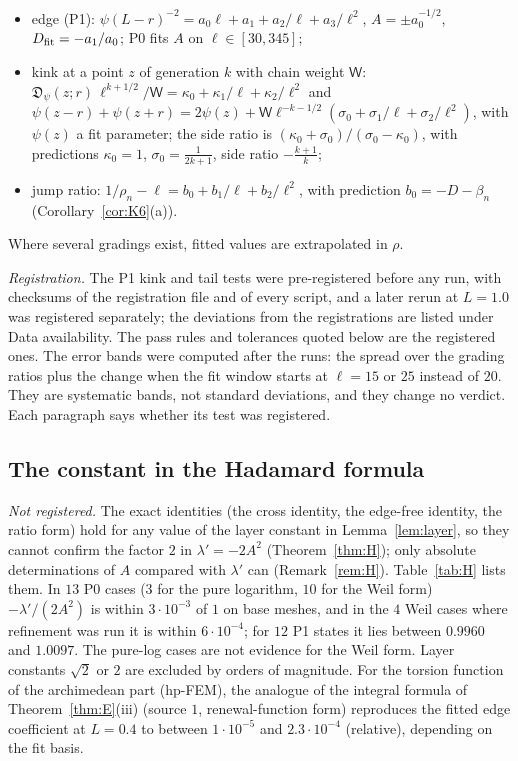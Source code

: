 \documentclass[11pt]{amsart}
\newcommand{\Dj}{\mathfrak{D}}
\newcommand{\e}[1]{\cdot 10^{#1}}
\theoremstyle{definition}
\theoremstyle{remark}
\numberwithin{equation}{section}
\begin{document}
\begin{itemize}
\item edge (P1): $\psi(L-r)^{-2}=a_0\ell+a_1+a_2/\ell+a_3/\ell^2$, $A=\pm a_0^{-1/2}$, $D_{\rm fit}=-a_1/a_0$; P0 fits $A$ on $\ell\in[30,345]$;
\item kink at a point $z$ of generation $k$ with chain weight $\mathsf W$: $\Dj_\psi(z;r)\,\ell^{k+1/2}/\mathsf W=\kappa_0+\kappa_1/\ell+\kappa_2/\ell^2$ and $\psi(z-r)+\psi(z+r)=2\psi(z)+\mathsf W\ell^{-k-1/2}(\sigma_0+\sigma_1/\ell+\sigma_2/\ell^2)$, with $\psi(z)$ a fit parameter; the side ratio is $(\kappa_0+\sigma_0)/(\sigma_0-\kappa_0)$, with predictions $\kappa_0=1$, $\sigma_0=\frac1{2k+1}$, side ratio $-\frac{k+1}k$;
\item jump ratio: $1/\rho_n-\ell=b_0+b_1/\ell+b_2/\ell^2$, with prediction $b_0=-D-\beta_n$ (Corollary~\ref{cor:K6}(a)).
\end{itemize}
Where several gradings exist, fitted values are extrapolated in $\rho$.

\emph{Registration.} The P1 kink and tail tests were pre-registered before any run, with checksums of the registration file and of every script, and a later rerun at $L=1.0$ was registered separately; the deviations from the registrations are listed under Data availability. The pass rules and tolerances quoted below are the registered ones. The error bands were computed after the runs: the spread over the grading ratios plus the change when the fit window starts at $\ell=15$ or $25$ instead of $20$. They are systematic bands, not standard deviations, and they change no verdict. Each paragraph says whether its test was registered.

\subsection{The constant in the Hadamard formula}
\emph{Not registered.} The exact identities (the cross identity, the edge-free identity, the ratio form) hold for any value of the layer constant in Lemma~\ref{lem:layer}, so they cannot confirm the factor $2$ in $\lambda'=-2A^2$ (Theorem~\ref{thm:H}); only absolute determinations of $A$ compared with $\lambda'$ can (Remark~\ref{rem:H}). Table~\ref{tab:H} lists them. In $13$ P0 cases ($3$ for the pure logarithm, $10$ for the Weil form) $-\lambda'/(2A^2)$ is within $3\e{-3}$ of $1$ on base meshes, and in the $4$ Weil cases where refinement was run it is within $6\e{-4}$; for $12$ P1 states it lies between $0.9960$ and $1.0097$. The pure-log cases are not evidence for the Weil form. Layer constants $\sqrt2$ or $2$ are excluded by orders of magnitude. For the torsion function of the archimedean part (hp-FEM), the analogue of the integral formula of Theorem~\ref{thm:E}(iii) (source $1$, renewal-function form) reproduces the fitted edge coefficient at $L=0.4$ to between $1\e{-5}$ and $2.3\e{-4}$ (relative), depending on the fit basis.
\end{document}
